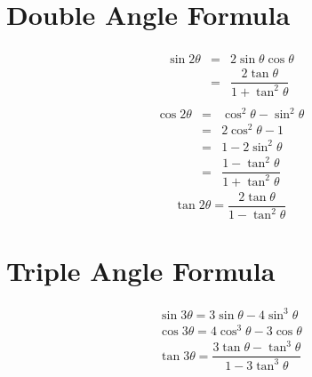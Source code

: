 \section{Double Angle Formula}
\begin{equation}
	\begin{aligned}
		\begin{split}
			\sin 2\theta &=& 2\sin \theta \cos \theta\\
			&=&\dfrac{2 \tan \theta}{1+\tan^2 \theta}
		\end{split}
	\end{aligned}
\end{equation}
\begin{equation}
	\begin{aligned}
		\begin{split}
			\cos 2\theta &=& \cos^2 \theta -\sin^2 \theta\\
			&=&2\cos^2 \theta-1\\
			&=&1-2\sin^2 \theta\\
			&=&\dfrac{1-\tan^2 \theta}{1+\tan^2 \theta}
		\end{split}
	\end{aligned}
\end{equation}
\begin{equation}
	\tan 2\theta=\dfrac{2 \tan \theta}{1-\tan^2 \theta}
\end{equation}


\section{Triple Angle Formula}
\begin{align}
	\sin 3\theta=3\sin \theta-4 \sin^3 \theta\\
	\cos 3\theta=4\cos^3 \theta-3 \cos \theta\\
	\tan 3\theta=\dfrac{3\tan \theta -\tan^3 \theta}{1-3\tan^3 \theta}
\end{align}


